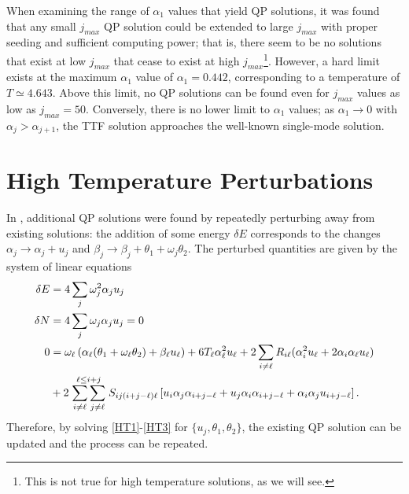 \documentclass[../PhD.tex]{subfiles}
\begin{document}
When examining the range of $\alpha_1$ values that yield QP solutions, it was found that any small $j_{max}$ QP solution could be extended to large $j_{max}$ with proper seeding and sufficient computing power; that is, there seem to be no solutions that exist at low $j_{max}$ that cease to exist at high $j_{max}$\footnote{This is not true for high temperature solutions, as we will see.}. However, a hard limit exists at the maximum $\alpha_1$ value of $\alpha_1=0.442$, corresponding to a temperature of $T \simeq 4.643$. Above this limit, no QP solutions can be found even for $j_{max}$ values as low as $j_{max}=50$. Conversely, there is no lower limit to $\alpha_1$ values; as $\alpha_1 \to 0$ with $\alpha_j > \alpha_{j+1}$, the TTF solution approaches the well-known single-mode solution.


\section{High Temperature Perturbations}
\label{ssec: highT}

In \cite{1507.08261}, additional QP solutions were found by repeatedly perturbing away from existing solutions: the addition of some energy $\delta E$ corresponds to the changes $\alpha_j \to \alpha_j + u_j$ and $\beta_j \to \beta_j + \theta_1 + \omega_j \theta_2$. The perturbed quantities are given by the system of linear equations
\begin{align}
\label{HT1}
\delta E &= 4 \sum_j \omega^2_j \alpha_j u_j \\
\label{HT2}
\delta N &= 4 \sum_j \omega_j \alpha_j u_j = 0 \\
\label{HT3}
0 &= \omega_\ell \left( \alpha_\ell (\theta_1 + \omega_\ell \theta_2) +\beta_\ell u_\ell \right) + 6T_\ell \alpha_\ell^2 u_\ell + 2 \sum_{i \neq \ell} R_{i\ell} (\alpha_i^2 u_\ell + 2 \alpha_i \alpha_\ell u_\ell ) \nonumber \\
& + 2 \stackrel{\ell \leq i + j}{\sum_{i \neq \ell} \sum_{j \neq \ell}} S_{ij(i+j-\ell)\ell} \left[ u_i \alpha_j \alpha_{i+j-\ell} + u_j \alpha_i \alpha_{i+j-\ell} + \alpha_i \alpha_j u_{i+j-\ell} \right].
\end{align}
Therefore, by solving \eqref{HT1}-\eqref{HT3} for $\{ u_j, \theta_1, \theta_2 \}$, the existing QP solution can be updated and the process can be repeated. 
\end{document}
